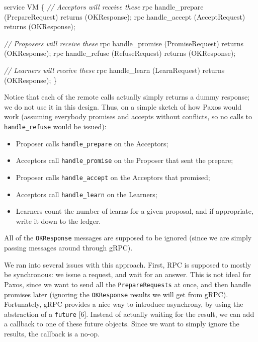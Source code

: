\documentclass[12pt,]{article}
\newenvironment{Shaded}{\begin{snugshade}}{\end{snugshade}}
\newcommand{\CommentTok}[1]{\textcolor[rgb]{0.56,0.35,0.01}{\textit{{#1}}}}
\newcommand{\NormalTok}[1]{{#1}}
\providecommand{\tightlist}{%
  \setlength{\itemsep}{0pt}\setlength{\parskip}{0pt}}
\begin{document}
\begin{Shaded}
\begin{Highlighting}[]
\NormalTok{service VM \{}
    \CommentTok{// Acceptors will receive these}
    \NormalTok{rpc handle_prepare (PrepareRequest) returns (OKResponse);}
    \NormalTok{rpc handle_accept (AcceptRequest) returns (OKResponse);}

    \CommentTok{// Proposers will receive these}
    \NormalTok{rpc handle_promise (PromiseRequest) returns (OKResponse);}
    \NormalTok{rpc handle_refuse (RefuseRequest) returns (OKResponse);}

    \CommentTok{// Learners will receive these}
    \NormalTok{rpc handle_learn (LearnRequest) returns (OKResponse);}
\NormalTok{\}}
\end{Highlighting}
\end{Shaded}

Notice that each of the remote calls actually simply returns a dummy
response; we do not use it in this design. Thus, on a simple sketch of
how Paxos would work (assuming everybody promises and accepts without
conflicts, so no calls to \texttt{handle\_refuse} would be issued):

\begin{itemize}
\tightlist
\item
  Proposer calls \texttt{handle\_prepare} on the Acceptors;
\item
  Acceptors call \texttt{handle\_promise} on the Proposer that sent the
  prepare;
\item
  Proposer calls \texttt{handle\_accept} on the Acceptors that promised;
\item
  Acceptors call \texttt{handle\_learn} on the Learners;
\item
  Learners count the number of learns for a given proposal, and if
  appropriate, write it down to the ledger.
\end{itemize}

All of the \texttt{OKResponse} messages are supposed to be ignored
(since we are simply passing messages around through gRPC).

We ran into several issues with this approach. First, RPC is supposed to
mostly be synchronous: we issue a request, and wait for an answer. This
is not ideal for Paxos, since we want to send all the
\texttt{PrepareRequests} at once, and then handle promises later
(ignoring the \texttt{OKResponse} results we will get from gRPC).
Fortunately, gRPC provides a nice way to introduce asynchrony, by using
the abstraction of a \texttt{future} {[}6{]}. Instead of actually
waiting for the result, we can add a callback to one of these future
objects. Since we want to simply ignore the results, the callback is a
no-op.
\end{document}
